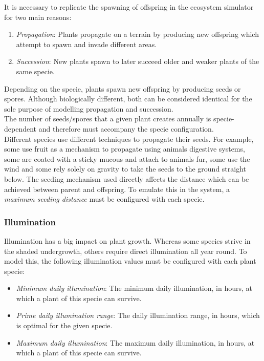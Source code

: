 It is necessary to replicate the spawning of offspring in the ecosystem simulator for two main reasons: 
\begin{enumerate}
\item \textit{Propagation}: Plants propagate on a terrain by producing new offspring which attempt to spawn and invade different areas. 
\item \textit{Succession}: New plants spawn to later succeed older and weaker plants of the same specie. 
\end{enumerate}

Depending on the specie, plants spawn new offspring by producing seeds or spores. Although biologically different, both can be considered identical for the sole purpose of modelling propagation and succession.\\
The number of seeds/spores that a given plant creates annually is specie-dependent and therefore must accompany the specie configuration.\\
Different species use different techniques to propagate their seeds. For example, some use fruit as a mechanism to propagate using animals digestive systems, some are coated with a sticky mucous and attach to animals fur, some use the wind and some rely solely on gravity to take the seeds to the ground straight below. The seeding mechanism used directly affects the distance which can be achieved between parent and offspring. To emulate this in the system, a \textit{maximum seeding distance} must be configured with each specie.

\subsubsection{Illumination}

Illumination has a big impact on plant growth. Whereas some species strive in the shaded undergrowth, others require direct illumination all year round. To model this, the following illumination values must be configured with each plant specie:

\begin{itemize}
\item \textit{Minimum daily illumination}: The minimum daily illumination, in hours, at which a plant of this specie can survive.
\item \textit{Prime daily illumination range}: The daily illumination range, in hours, which is optimal for the given specie.
\item \textit{Maximum daily illumination}: The maximum daily illumination, in hours, at which a plant of this specie can survive.
\end{itemize}

